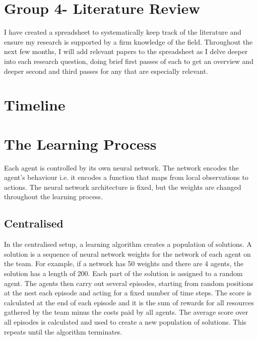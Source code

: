 \documentclass[12pt]{article}
\begin{document}
\section{Group 4- Literature Review}\label{group_4}

I have created a spreadsheet to systematically keep track of the literature and ensure my research is supported by a firm knowledge of the field. 
Throughout the next few months, I will add relevant papers to the spreadsheet as I delve deeper into each research question, doing brief first passes of each to get an overview and deeper second and third passes for any that are especially relevant.

\section{Timeline} \label{timeline}






\appendix

\section{The Learning Process}\label{learning}

Each agent is controlled by its own neural network. 
The network encodes the agent’s behaviour i.e. it encodes a function that maps from local observations to actions. 
The neural network architecture is fixed, but the weights are changed throughout the learning process.\\

\subsection{Centralised}

In the centralised setup, a learning algorithm creates a population of solutions. 
A solution is a sequence of neural network weights for the network of each agent on the team. 
For example, if a network has 50 weights and there are 4 agents, the solution has a length of 200. 
Each part of the solution is assigned to a random agent. 
The agents then carry out several episodes, starting from random positions at the nest each episode and acting for a fixed number of time steps. 
The score is calculated at the end of each episode and it is the sum of rewards for all resources gathered by the team minus the costs paid by all agents. 
The average score over all episodes is calculated and used to create a new population of solutions. 
This repeats until the algorithm terminates.\\
\end{document}
